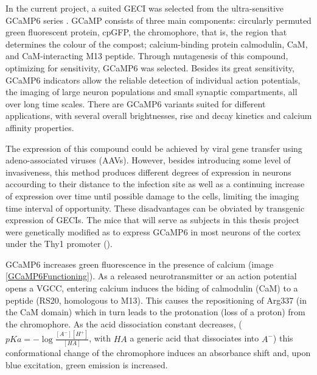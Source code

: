 In the current project, a suited GECI was selected from the ultra-sensitive GCaMP6 series \cite{Chen2013}. GCaMP consists of three main components: circularly permuted green fluorescent protein, cpGFP, the chromophore, that is, the region that determines the colour of the compost; calcium-binding protein calmodulin, CaM, and CaM-interacting M13 peptide. Through mutagenesis of this compound, optimizing for sensitivity, GCaMP6 was selected. Besides its great sensitivity, GCaMP6 indicators allow the reliable detection of individual action potentials, the imaging of large neuron populations and small synaptic compartments, all over long time scales. There are GCaMP6 variants suited for different applications, with several overall brightnesses, rise and decay kinetics and calcium affinity properties.

The expression of this compound could be achieved by viral gene transfer using adeno-associated viruses (AAVs). However, besides introducing some level of invasiveness, this method produces different degrees of expression in neurons accourding to their distance to the infection site as well as a continuing increase of expression over time until possible damage to the cells, limiting the imaging time interval of opportunity. These disadvantages can be obviated by transgenic expression of GECIs. The mice that will serve as subjects in this thesis project were genetically modified as to express GCaMP6 in most neurons of the cortex under the Thy1 promoter (\cite{Dana2014}). 

GCaMP6 increases green fluorescence in the presence of calcium (image \ref{GCaMP6Functioning}). As a released neurotransmitter or an action potential opens a VGCC, entering calcium induces the biding of calmodulin (CaM) to a peptide (RS20, homologous to M13). This causes the repositioning of Arg337 (in the CaM domain) which in turn leads to the protonation (loss of a proton) from the chromophore. As the acid dissociation constant decreases, ($pKa= - \log \frac{[A^-][H^+]}{[HA]}$, with $HA$ a generic acid that dissociates into $A^-$) this conformational change of the chromophore induces an absorbance shift and, upon blue excitation, green emission is increased.


